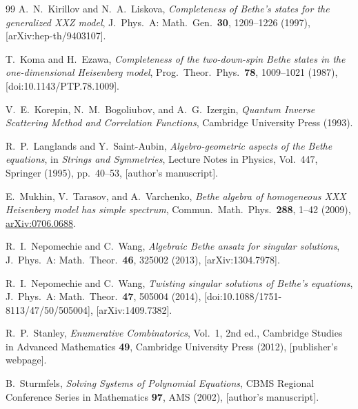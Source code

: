 \documentclass[11pt]{article}
\theoremstyle{definition}
\begin{document}
\begin{thebibliography}{99}
A.~N.~Kirillov and N.~A.~Liskova,
\emph{Completeness of Bethe's states for the generalized XXZ model},
J.\ Phys.\ A: Math.\ Gen.\ \textbf{30}, 1209--1226 (1997),
[arXiv:hep-th/9403107].

T.~Koma and H.~Ezawa,
\emph{Completeness of the two-down-spin Bethe states in the
one-dimensional Heisenberg model},
Prog.\ Theor.\ Phys.\ \textbf{78}, 1009--1021 (1987),
[doi:10.1143/PTP.78.1009].

V.~E.~Korepin, N.~M.~Bogoliubov, and A.~G.~Izergin,
\emph{Quantum Inverse Scattering Method and Correlation Functions},
Cambridge University Press (1993).

R.~P.~Langlands and Y.~Saint-Aubin,
\emph{Algebro-geometric aspects of the Bethe equations},
in \emph{Strings and Symmetries}, Lecture Notes in Physics, Vol.~447, Springer (1995), pp.~40--53,
[author's manuscript].

E.~Mukhin, V.~Tarasov, and A.~Varchenko,
\emph{Bethe algebra of homogeneous XXX Heisenberg model has simple spectrum},
Commun.\ Math.\ Phys.\ \textbf{288}, 1--42 (2009),
\href{https://arxiv.org/abs/0706.0688}{arXiv:0706.0688}.

R.~I.~Nepomechie and C.~Wang,
\emph{Algebraic Bethe ansatz for singular solutions},
J.\ Phys.\ A: Math.\ Theor.\ \textbf{46}, 325002 (2013),
[arXiv:1304.7978].

R.~I.~Nepomechie and C.~Wang,
\emph{Twisting singular solutions of Bethe's equations},
J.\ Phys.\ A: Math.\ Theor.\ \textbf{47}, 505004 (2014),
[doi:10.1088/1751-8113/47/50/505004],
[arXiv:1409.7382].

R.~P.~Stanley,
\emph{Enumerative Combinatorics}, Vol.~1, 2nd ed.,
Cambridge Studies in Advanced Mathematics \textbf{49},
Cambridge University Press (2012),
[publisher's webpage].

B.~Sturmfels,
\emph{Solving Systems of Polynomial Equations},
CBMS Regional Conference Series in Mathematics \textbf{97}, AMS (2002),
[author's manuscript].

\end{thebibliography}
\end{document}
